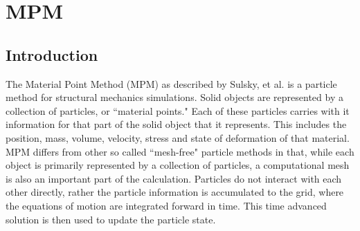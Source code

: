 
\newcommand{\tn}[1]{\mbox{\bf{#1}}}
\newcommand{\sig}{\mbox{\boldmath $\sigma \!\!$ \unboldmath}}
\newcommand{\bnabla} {\mbox{\boldmath $\nabla \!\!$ \unboldmath}}
\newcommand{\taubold} {\mbox{\boldmath $\tau \!\!$ \unboldmath}}
\newcommand{\f}{\ensuremath{f^{\theta}_r} }

\newcommand{\Texp}{\rm{exp}}
\newcommand{\Text}{\rm{ext}}
\newcommand{\Tint}{\rm{int}}
\newcommand{\Teq}{\rm{eq}}
\newcommand{\Delt}{\ensuremath{\Delta t}}
\newcommand{\Ep}{\ensuremath{\epsilon_p}}
\newcommand{\Epdot}[1]{\ensuremath{\dot{\epsilon}_{p#1}}}
\def\bfE{{\bf E}}
\newcommand{\BD}{\ensuremath{\boldsymbol{D}}}
\newcommand{\Half}{\ensuremath{\frac{1}{2}}}
\newcommand{\Bsig}{\ensuremath{\boldsymbol{\sigma}}}
\newcommand{\Bn}{\ensuremath{\boldsymbol{n}}}
\newcommand{\Bg}{\ensuremath{\boldsymbol{g}}}

\def\rmd{{\rm d}}
\def\rme{{\rm e}}
\def\rmf{{\rm f}}
\def\rmr{{\rm r}}
\def\rmR{{\rm R}}
\def\rms{{\rm s}}
\def\bfE{{\bf E}}
\def\bfF{{\bf F}}
\def\bff{{\bf f}}
\def\bfg{{\bf g}}
\def\bfI{{\bf I}}
\def\bfj{{\bf j}}
\def\bfm{{\bf m}}
\def\bfr{{\bf r}}
\def\bfx{{\bf x}}
\def\bfu{{\bf u}}
\def\rmg{{\rm g}}
\def\bfa{{\bf a}}
\def\bfG{{\bf G}}
\def\bfv{{\bf v}}
\def\tdot{{\textstyle\cdot}}

\section{MPM} \label{Sec:MPM}

\subsection{Introduction}

The Material Point Method (MPM) as described by Sulsky, et al.
\cite{sulskycmame,sulskycpc} is a particle method for structural
mechanics simulations.  Solid objects are represented by a
collection of particles, or ``material points."  Each
of these particles carries with it information for that part of the
solid object that it represents.  This includes the position, mass, volume,
velocity, stress and state of deformation of that material.  MPM differs from
other so called ``mesh-free" particle methods in that, while each object
is primarily represented by a collection of particles, a computational mesh
is also an important part of the calculation.  Particles do not interact
with each other directly, rather the particle information is accumulated
to the grid, where the equations of motion are integrated forward in time.
This time advanced solution is then used to update the particle state.

